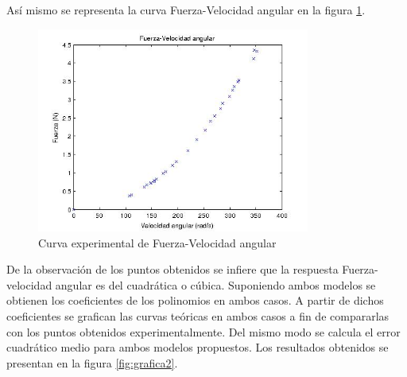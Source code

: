 \documentclass[spanish,12pt,a4paper,titlepage]{report}
\begin{document}
Así mismo se representa la curva Fuerza-Velocidad angular en la figura \ref{fig:grafica1}.


\begin{figure}
  \vspace{-20pt}
  \begin{center}
    \includegraphics[width=0.8\textwidth]{./Pics/puntosfvel.jpg}
  \end{center}
  \vspace{-20pt}
  \caption{Curva experimental de Fuerza-Velocidad angular}
  \label{fig:grafica1}
  \vspace{-10pt}
\end{figure}


De la observación de los puntos obtenidos se infiere que la respuesta Fuerza-velocidad angular es del cuadrática o cúbica. Suponiendo ambos modelos se obtienen los coeficientes de los polinomios en ambos casos. A partir de dichos coeficientes se grafican las curvas teóricas en ambos casos a fin de compararlas con los puntos obtenidos experimentalmente. Del mismo modo se calcula el error cuadrático medio para ambos modelos propuestos. Los resultados obtenidos se presentan en la figura \ref{fig:grafica2}.
\end{document}
